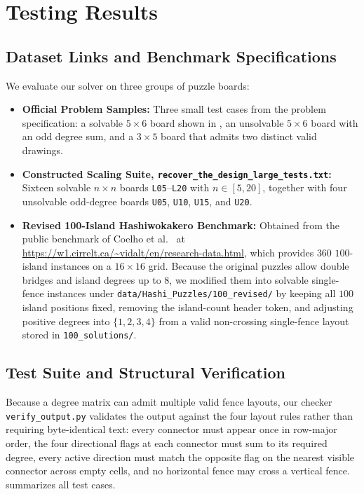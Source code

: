 \documentclass[10pt, a4paper]{article}
\newcommand{\code}[1]{\texttt{\color{primary!90!black}#1}}
\begin{document}
\clearpage

\section{Testing Results}

\subsection{Dataset Links and Benchmark Specifications}
We evaluate our solver on three groups of puzzle boards:
\begin{itemize}
  \item \textbf{Official Problem Samples:} Three small test cases from the problem specification: a solvable $5 \times 6$ board shown in , an unsolvable $5 \times 6$ board with an odd degree sum, and a $3 \times 5$ board that admits two distinct valid drawings.
  \item \textbf{Constructed Scaling Suite, \code{recover\_the\_design\_large\_tests.txt}:} Sixteen solvable $n \times n$ boards \code{L05}--\code{L20} with $n \in [5, 20]$, together with four unsolvable odd-degree boards \code{U05}, \code{U10}, \code{U15}, and \code{U20}.
  \item \textbf{Revised 100-Island Hashiwokakero Benchmark:} Obtained from the public benchmark of Coelho et al.~\cite{coelho2019hashi} at \url{https://w1.cirrelt.ca/~vidalt/en/research-data.html}, which provides $360$ $100$-island instances on a $16 \times 16$ grid. Because the original puzzles allow double bridges and island degrees up to $8$, we modified them into solvable single-fence instances under \code{data/Hashi\_Puzzles/100\_revised/} by keeping all $100$ island positions fixed, removing the island-count header token, and adjusting positive degrees into $\{1,2,3,4\}$ from a valid non-crossing single-fence layout stored in \code{100\_solutions/}.
\end{itemize}

\subsection{Test Suite and Structural Verification}
Because a degree matrix can admit multiple valid fence layouts, our checker \code{verify\_output.py} validates the output against the four layout rules rather than requiring byte-identical text: every connector must appear once in row-major order, the four directional flags at each connector must sum to its required degree, every active direction must match the opposite flag on the nearest visible connector across empty cells, and no horizontal fence may cross a vertical fence.  summarizes all test cases.
\end{document}
